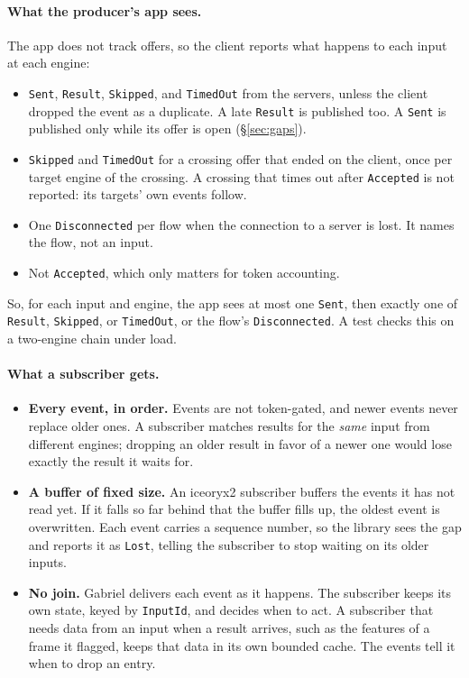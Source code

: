 \documentclass[11pt]{article}
\newcommand{\code}[1]{\texttt{#1}}
\begin{document}
\paragraph{What the producer's app sees.} The app does not track offers, so
the client reports what happens to each input at each engine:
\begin{itemize}[nosep]
  \item \code{Sent}, \code{Result}, \code{Skipped}, and \code{TimedOut} from
        the servers, unless the client dropped the event as a duplicate. A
        late \code{Result} is published too. A \code{Sent} is published only
        while its offer is open (\S\ref{sec:gaps}).
  \item \code{Skipped} and \code{TimedOut} for a crossing offer that ended on
        the client, once per target engine of the crossing. A crossing that
        times out after \code{Accepted} is not reported: its targets' own
        events follow.
  \item One \code{Disconnected} per flow when the connection to a server is
        lost. It names the flow, not an input.
  \item Not \code{Accepted}, which only matters for token accounting.
\end{itemize}
So, for each input and engine, the app sees at most one \code{Sent}, then
exactly one of \code{Result}, \code{Skipped}, or \code{TimedOut}, or the
flow's \code{Disconnected}. A test checks this on a two-engine chain under
load.

\paragraph{What a subscriber gets.}
\begin{itemize}[nosep]
  \item \textbf{Every event, in order.} Events are not token-gated, and newer
        events never replace older ones. A subscriber matches results for the
        \emph{same} input from different engines; dropping an older result in
        favor of a newer one would lose exactly the result it waits for.
  \item \textbf{A buffer of fixed size.} An iceoryx2 subscriber buffers the
        events it has not read yet. If it falls so far behind that the buffer
        fills up, the oldest event is overwritten. Each event carries a
        sequence number, so the library sees the gap and reports it as
        \code{Lost}, telling the subscriber to stop waiting on its older
        inputs.
  \item \textbf{No join.} Gabriel delivers each event as it happens. The
        subscriber keeps its own state, keyed by \code{InputId}, and decides
        when to act. A subscriber that needs data from an input when a result
        arrives, such as the features of a frame it flagged, keeps that data
        in its own bounded cache. The events tell it when to drop an entry.
\end{itemize}
\end{document}

